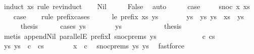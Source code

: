 \begin{isabellebody}
%
\isadelimproof
%
\endisadelimproof
%
\isatagproof
{}\isamarkupfalse%
\ {\isacharparenleft}induct\ xs\ rule{\isacharcolon}\ rev{\isacharunderscore}induct{\isacharparenright}\isanewline
\ \ \isamarkupfalse%
\ Nil\isanewline
\ \ \isamarkupfalse%
\ \isamarkupfalse%
\ False\ \isamarkupfalse%
\ auto\isanewline
\ \ \isamarkupfalse%
\ \isamarkupfalse%
\ {\isacharquery}case\ \isacommand{{\isachardot}{\isachardot}}\isamarkupfalse%
\isanewline
{}\isamarkupfalse%
\isanewline
\ \ \isamarkupfalse%
\ {\isacharparenleft}snoc\ x\ xs{\isacharparenright}\isanewline
\ \ \isamarkupfalse%
\ {\isacharquery}case\isanewline
\ \ \isamarkupfalse%
\ {\isacharparenleft}rule\ prefix{\isacharunderscore}cases{\isacharparenright}\isanewline
\ \ \ \ \isamarkupfalse%
\ le{\isacharcolon}\ {\isachardoublequoteopen}prefix\ xs\ ys{\isachardoublequoteclose}\isanewline
\ \ \ \ \isamarkupfalse%
\ \isamarkupfalse%
\ ys{\isacharprime}\ \ ys{\isacharcolon}\ {\isachardoublequoteopen}ys\ {\isacharequal}\ xs\ {\isacharat}\ ys{\isacharprime}{\isachardoublequoteclose}\ \isacommand{{\isachardot}{\isachardot}}\isamarkupfalse%
\isanewline
\ \ \ \ \isamarkupfalse%
\ {\isacharquery}thesis\isanewline
\ \ \ \ \isamarkupfalse%
\ {\isacharparenleft}cases\ ys{\isacharprime}{\isacharparenright}\isanewline
\ \ \ \ \ \ \isamarkupfalse%
\ {\isachardoublequoteopen}ys{\isacharprime}\ {\isacharequal}\ {\isacharbrackleft}{\isacharbrackright}{\isachardoublequoteclose}\isanewline
\ \ \ \ \ \ \isamarkupfalse%
\ \isamarkupfalse%
\ {\isacharquery}thesis\ \isamarkupfalse%
\ {\isacharparenleft}metis\ append{\isacharunderscore}Nil{}\ parallelE\ prefixI\ snoc{\isachardot}prems\ ys{\isacharparenright}\isanewline
\ \ \ \ \isamarkupfalse%
\isanewline
\ \ \ \ \ \ \isamarkupfalse%
\ c\ cs\ \isamarkupfalse%
\ ys{\isacharprime}{\isacharcolon}\ {\isachardoublequoteopen}ys{\isacharprime}\ {\isacharequal}\ c\ {\isacharhash}\ cs{\isachardoublequoteclose}\isanewline
\ \ \ \ \ \ \isamarkupfalse%
\ {\isachardoublequoteopen}x\ {\isasymnoteq}\ c{\isachardoublequoteclose}\ \isamarkupfalse%
\ snoc{\isachardot}prems\ ys\ ys{\isacharprime}\ \isamarkupfalse%
\ fastforce\isanewline
\ \ \ \ \ \ \isamarkupfalse%

\end{isabellebody}
